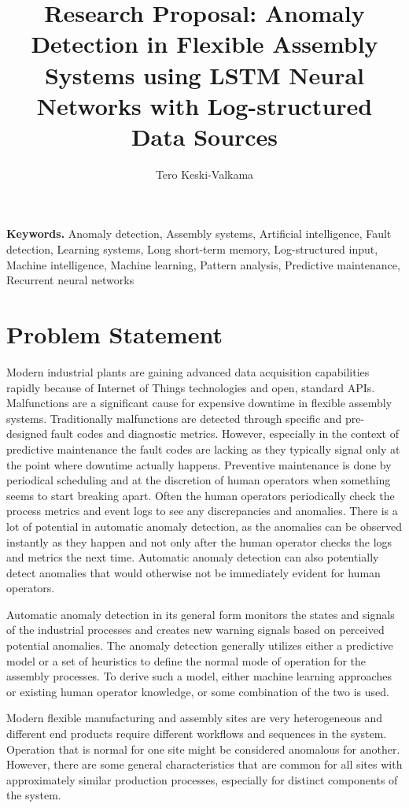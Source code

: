 \documentclass[a4paper,10pt]{article}
\title{Research Proposal: Anomaly Detection in Flexible Assembly Systems using LSTM Neural Networks with Log-structured Data Sources}
\author{Tero Keski-Valkama}
\begin{document}
\maketitle

\smallskip
\noindent \textbf{Keywords.} Anomaly detection, Assembly systems, Artificial intelligence, Fault detection, Learning systems, Long short-term memory,
Log-structured input, Machine intelligence, Machine learning, Pattern analysis, Predictive maintenance, Recurrent neural networks

\section{Problem Statement}

Modern industrial plants are gaining advanced data acquisition capabilities rapidly because of Internet of Things technologies and open, standard APIs.
Malfunctions are a significant cause for expensive downtime in flexible assembly systems. Traditionally malfunctions are detected through specific and pre-designed fault codes
and diagnostic metrics. However, especially in the context of predictive maintenance the fault codes are lacking as they typically signal only at the point where downtime
actually happens. Preventive maintenance is done by periodical scheduling and at the discretion of human operators when something seems to start breaking apart.
Often the human operators periodically check the process metrics and event logs to see any discrepancies and anomalies. There is a lot of potential in automatic anomaly
detection, as the anomalies can be observed instantly as they happen and not only after the human operator checks the logs and metrics the next time. Automatic
anomaly detection can also potentially detect anomalies that would otherwise not be immediately evident for human operators.

Automatic anomaly detection in its general form monitors the states and signals of the industrial processes and creates new warning signals based on perceived potential anomalies.
The anomaly detection generally utilizes either a predictive model or a set of heuristics to define the normal mode of operation for the assembly processes. To derive such a model,
either machine learning approaches or existing human operator knowledge, or some combination of the two is used.

Modern flexible manufacturing and assembly sites are very heterogeneous and different end products require different workflows and sequences in the system. Operation that is normal
for one site might be considered anomalous for another. However, there are some general characteristics that are common for all sites with approximately similar
production processes, especially for distinct components of the system.
\end{document}
